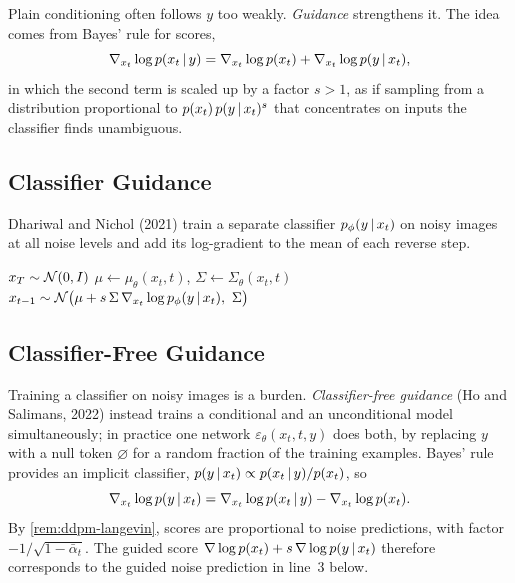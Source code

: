 Plain conditioning often follows $y$ too weakly. \emph{Guidance} strengthens it. The idea comes from Bayes' rule for scores,
\[
\nabla_{x_t}\log p(x_t\,|\, y)=\nabla_{x_t}\log p(x_t)+\nabla_{x_t}\log p(y\,|\, x_t),
\]
in which the second term is scaled up by a factor $s>1$, as if sampling from a distribution proportional to $p(x_t)\,p(y\,|\, x_t)^s$ that concentrates on inputs the classifier finds unambiguous.

\subsection{Classifier Guidance}

Dhariwal and Nichol (2021) train a separate classifier $p_\phi(y\,|\, x_t)$ on noisy images at all noise levels and add its log-gradient to the mean of each reverse step.

\begin{algorithm}[H]
\caption{Classifier-Guided Diffusion Sampling}\label{alg:classifier-guidance}
\begin{algorithmic}[1]
\State $x_T\sim\mathcal{N}(0,I)$
  \State $\mu\gets\mu_\theta(x_t,t)$, \quad $\Sigma\gets\Sigma_\theta(x_t,t)$
  \State $x_{t-1}\sim\mathcal{N}\big(\mu+s\,\Sigma\,\nabla_{x_t}\log p_\phi(y\,|\, x_t),\ \Sigma\big)$
\EndFor
{}
\end{algorithmic}
\end{algorithm}

\subsection{Classifier-Free Guidance}

Training a classifier on noisy images is a burden. \emph{Classifier-free guidance} (Ho and Salimans, 2022) instead trains a conditional and an unconditional model simultaneously; in practice one network $\varepsilon_\theta(x_t,t,y)$ does both, by replacing $y$ with a null token $\varnothing$ for a random fraction of the training examples. Bayes' rule provides an implicit classifier, $p(y\,|\, x_t)\propto p(x_t\,|\, y)/p(x_t)$, so
\[
\nabla_{x_t}\log p(y\,|\, x_t)=\nabla_{x_t}\log p(x_t\,|\, y)-\nabla_{x_t}\log p(x_t).
\]
By \cref{rem:ddpm-langevin}, scores are proportional to noise predictions, with factor $-1/\sqrt{1-\bar\alpha_t}$. The guided score $\nabla\log p(x_t)+s\,\nabla\log p(y\,|\, x_t)$ therefore corresponds to the guided noise prediction in line~3 below.

